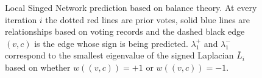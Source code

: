 \begin{figure}[!ht]
  


    \caption{Local Singed Network prediction based on balance theory. At every iteration $i$ the dotted red lines are prior votes, solid blue lines are relationships based on voting records and the dashed black edge $(v,c)$ is the edge whose sign is being predicted. $\lambda_1^+$ and $\lambda_1^-$ correspond to the smallest eigenvalue of the signed Laplacian $\overline{L}_i$ based on whether $w((v,c))=+1$ or $w((v,c))=-1$.     }
    \label{fig:lsn-balance}
\end{figure}